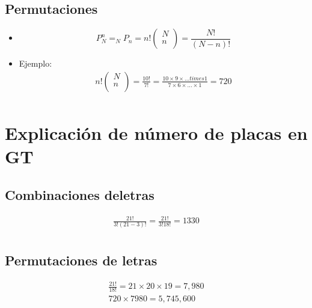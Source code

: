 \subsection{Permutaciones}
\begin{itemize}
    \item \[
        P_N^n = _NP_n = n!\left( \begin{matrix}
            N \\ 
            n \\ 
        \end{matrix} \right) = \frac{N!}{(N-n)!} 
      \]
    
    \item Ejemplo:
        \begin{align*}
            n! \left(\begin{matrix}
                N \\ n \\ 
            \end{matrix}\right) = \frac{10!}{7!}  = \frac{10 \times 9 \times ... times 1}{7 \times 6 \times  ...  \times 1} = 720 \\  
        \end{align*}
\end{itemize}



\section{Explicación de número de placas en GT }
\subsection{Combinaciones deletras}
\begin{align*}
    \frac{21!}{3!(21-3)!} = \frac{21!}{3!18!} = 1330 \\  
\end{align*}

\subsection{Permutaciones de letras}
\begin{align*}
    \frac{21!}{18!} = 21 \times 20 \times 19 = 7,980 \\ 
    720 \times 7980 = 5,745,600 \\ 
\end{align*}


